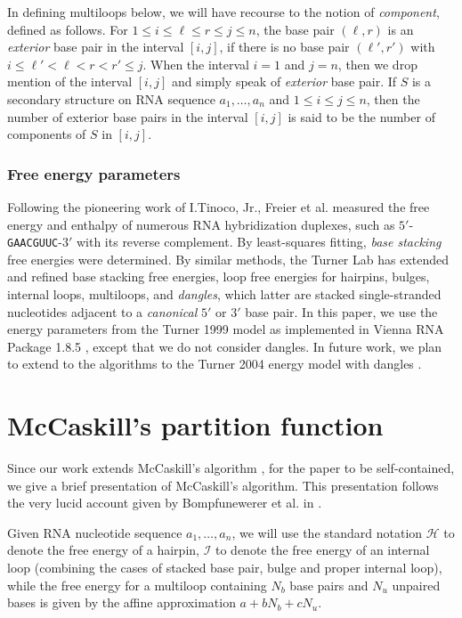 In defining multiloops below, we will
have recourse to the notion of {\em component}, defined as follows.
For $1 \leq i \leq \ell \leq r \leq j \leq n$, the base pair $(\ell,r)$
is an {\em exterior} base pair in the interval $[i,j]$, if there is no
base pair $(\ell',r')$ with $i \leq \ell'<\ell < r < r' \leq j$.
When the interval $i=1$ and $j=n$, then we drop mention of the interval
$[i,j]$ and simply speak of {\em exterior} base pair.
If $S$ is a secondary structure on RNA sequence $a_1,\ldots,a_n$ and
$1 \leq i\leq j \leq n$, then the number of exterior base pairs in
the interval $[i,j]$ is said to be the number of components of $S$ in $[i,j]$.

\subsubsection*{Free energy parameters}
Following the pioneering work of I.Tinoco, Jr.,
Freier et al. \cite{Freier.pnas86} measured the free energy and
enthalpy of numerous RNA hybridization duplexes, such as
$5'$-{\tt GAACGUUC}-$3'$ with its reverse complement. By least-squares
fitting, {\em base stacking} free energies were determined. By similar
methods, the Turner Lab \cite{turner,xia:RNA}
has extended and refined base stacking free energies,
loop free energies for hairpins, bulges, internal loops, multiloops, and
{\em dangles}, which latter are
stacked single-stranded nucleotides adjacent to a
{\em canonical} $5'$ or $3'$ base pair. In this paper, we use the
energy parameters from the Turner 1999 model \cite{turner,xia:RNA}
as implemented in Vienna RNA Package 1.8.5
\cite{hofacker:ViennaWebServer}, except that we do not consider
dangles. In future work, we plan to extend to the algorithms to
the Turner 2004 energy model with dangles \cite{Turner.nar09}.

\section{McCaskill's partition function}
\label{section:McCaskill}

Since our work extends McCaskill's algorithm \cite{mcCaskill}, for the
paper to be self-contained, we give a brief presentation
of McCaskill's algorithm. This presentation follows the very lucid
account given by Bompfunewerer et al.  in \cite{Bompfunewerer.jmb08}.

Given RNA nucleotide sequence $a_1,\ldots,a_n$, we will use the standard
notation $\mathcal{H}$ to denote the free energy of a hairpin,
$\mathcal{I}$ to denote the free energy of an internal loop
(combining the cases of stacked base pair, bulge and proper internal
loop), while the
free energy for a multiloop containing $N_b$ base pairs and $N_u$ unpaired
bases is given by the affine approximation $a+bN_b+cN_u$.

